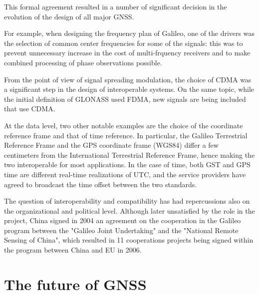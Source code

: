 \par

This formal agreement resulted in a number of significant decision in the
evolution of the design of all major GNSS.

For example, when designing the frequency plan of Galileo, one of the drivers
was the selection of common center frequencies for some of the signals: this was
to prevent unnecessary increase in the cost of multi-frquency receivers and to
make combined processing of phase observations possible.

From the point of view of signal spreading modulation, the choice of CDMA was a
significant step in the design of interoperable systems. On the same topic,
while the initial definition of GLONASS used FDMA, new signals are being
included that use CDMA.

At the data level, two other notable examples are the choice of the coordinate
reference frame and that of time reference. In particular, the Galileo
Terrestrial Reference Frame and the GPS coordinate frame (WGS84) differ a few
centimeters from the International Terrestrial Reference Frame, hence making the
two interoperable for most applications. In the case of time, both GST and GPS
time are different real-time realizations of UTC, and the service providers have
agreed to broadcast the time offset between the two standards.

The question of interoperability and compatibility has had repercussions also on
the organizational and political level. Although later unsatisfied by the role
in the project, China signed in 2004 an agreement on the cooperation in the
Galileo program between the "Galileo Joint Undertaking" and the "National Remote
Sensing of China", which resulted in 11 cooperations projects being signed
within the program between China and EU in 2006.

\section{The future of GNSS}
